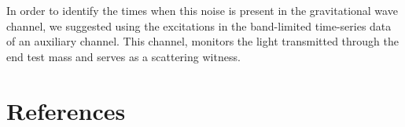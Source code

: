 \documentclass[12pt]{iopart}
\begin{document}
In order to identify the times when this noise is present in the gravitational wave channel, we suggested using the excitations in the band-limited time-series data of an auxiliary channel. This channel, monitors the light transmitted through the end test mass and serves as a scattering witness.


  




%
%



\newpage
\section*{References}




\end{document}
